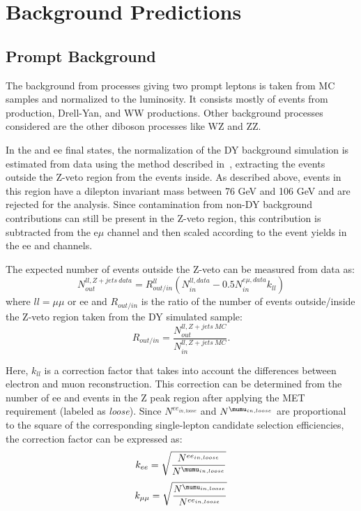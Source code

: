 \clearpage
\section{Background Predictions}
\label{tW_background}

\subsection{Prompt Background}
\label{tW_DY_background}
The background from processes giving two prompt leptons is taken from MC samples and normalized to the luminosity. It consists mostly of events from \ttbar production, Drell-Yan, and WW productions. Other background processes considered are the other diboson processes like WZ and ZZ.

In the \mumu and ee final states, the normalization of the DY background simulation is estimated from data using the method described in~\cite{topPAS11_002,TOP-11-005_paper,TOP-12-007_paper,bib:TOP-15-003_paper}, extracting the events outside the Z-veto region from the events inside.
As described above, events in this region have a dilepton invariant mass between 76 GeV and 106 GeV and are rejected for the analysis.
Since contamination from non-DY background contributions can still be present in the Z-veto region, this contribution is subtracted from the e$\mu$ channel and then scaled according to the event yields in the ee and \mumu channels.

The expected number of events outside the Z-veto can be measured from data as:
$$N^{ll, Z+jets~data}_{out} = R^{ll}_{out/in}( N^{ll,data}_{in} -0.5 N^{e\mu,data}_{in} k_{ll})$$
where $ll = \mu\mu$  or ee  and $R_{out/in}$ is the ratio of the number of events outside/inside the Z-veto region taken from the DY simulated sample:
$$R_{out/in}= \frac{N^{ll,Z+jets~MC}_{out}}{N^{ll,Z+jets~MC}_{in}}.$$

Here, $k_{ll}$ is a correction factor that takes into account the differences between electron and muon reconstruction.
This correction can be determined from the number of ee and \mumu events in the Z peak region after applying the MET requirement (labeled as \textit{loose}).
Since $N^{ee_{in, loose}}$ and $N^{\mumu_{in, loose}}$ are proportional to the square of the corresponding single-lepton candidate selection efficiencies, the correction factor can be expressed as: $$k_{ee} = \sqrt{\frac{N^{ee_{in, loose}}}{N^{\mumu_{in, loose}}}}$$
$$k_{\mu\mu} = \sqrt{\frac{N^{\mumu_{in, loose}}}{N^{ee_{in, loose}}}}$$


